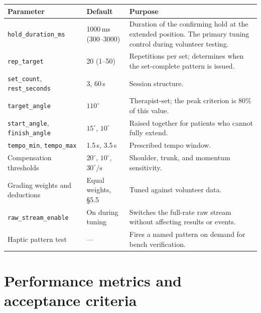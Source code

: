 \documentclass[11pt]{article}
\begin{document}
\begin{table}[H]
\centering\small
\begin{tabularx}{\linewidth}{@{}p{40mm} p{30mm} X@{}}
\toprule
\textbf{Parameter} & \textbf{Default} & \textbf{Purpose} \\
\midrule
\texttt{hold\_duration\_ms} & 1000\,ms (300--3000) & Duration of the confirming hold at the extended position. The primary tuning control during volunteer testing. \\
\texttt{rep\_target} & 20 (1--50) & Repetitions per set; determines when the set-complete pattern is issued. \\
\texttt{set\_count}, \texttt{rest\_seconds} & 3, 60\,s & Session structure. \\
\texttt{target\_angle} & $110^{\circ}$ & Therapist-set; the peak criterion is 80\% of this value. \\
\texttt{start\_angle}, \texttt{finish\_angle} & $15^{\circ}$, $10^{\circ}$ & Raised together for patients who cannot fully extend. \\
\texttt{tempo\_min}, \texttt{tempo\_max} & 1.5\,s, 3.5\,s & Prescribed tempo window. \\
Compensation thresholds & $20^{\circ}$, $10^{\circ}$, $30^{\circ}/\text{s}$ & Shoulder, trunk, and momentum sensitivity. \\
Grading weights and deductions & Equal weights, \S5.5 & Tuned against volunteer data. \\
\texttt{raw\_stream\_enable} & On during tuning & Switches the full-rate raw stream without affecting results or events. \\
Haptic pattern test & --- & Fires a named pattern on demand for bench verification. \\
\bottomrule
\end{tabularx}
\end{table}

\section{Performance metrics and acceptance criteria}
\end{document}
